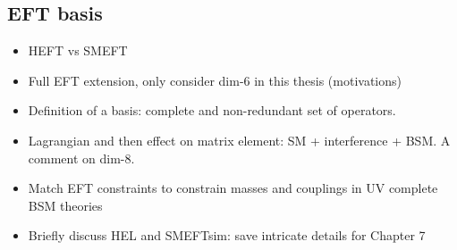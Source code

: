 \subsection{EFT basis}
\begin{itemize}
    \item HEFT vs SMEFT
    \item Full EFT extension, only consider dim-6 in this thesis (motivations)
    \item Definition of a basis: complete and non-redundant set of operators.
    \item Lagrangian and then effect on matrix element: SM + interference + BSM. A comment on dim-8.
    \item Match EFT constraints to constrain masses and couplings in UV complete BSM theories
    \item Briefly discuss HEL and SMEFTsim: save intricate details for Chapter 7
\end{itemize}